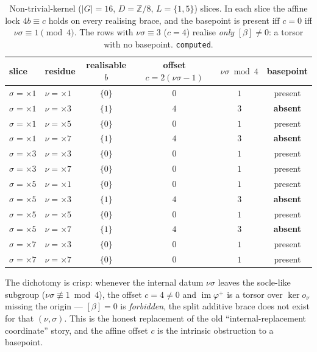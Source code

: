 \documentclass[11pt]{article}
\newcommand{\im}{\operatorname{im}}
\newcommand{\Z}{\mathbb{Z}}
\begin{document}
\begin{table}[h]
\centering
\small
\begin{tabular}{llcccc}
\toprule
slice & residue & realisable $b$ & offset $c=2(\nu\sigma{-}1)$ & $\nu\sigma\bmod 4$ & basepoint\\
\midrule
$\sigma={\times}1$ & $\nu={\times}1$ & $\{0\}$ & $0$ & $1$ & present\\
$\sigma={\times}1$ & $\nu={\times}3$ & $\{1\}$ & $4$ & $3$ & \textbf{absent}\\
$\sigma={\times}1$ & $\nu={\times}5$ & $\{0\}$ & $0$ & $1$ & present\\
$\sigma={\times}1$ & $\nu={\times}7$ & $\{1\}$ & $4$ & $3$ & \textbf{absent}\\
$\sigma={\times}3$ & $\nu={\times}3$ & $\{0\}$ & $0$ & $1$ & present\\
$\sigma={\times}3$ & $\nu={\times}7$ & $\{0\}$ & $0$ & $1$ & present\\
$\sigma={\times}5$ & $\nu={\times}1$ & $\{0\}$ & $0$ & $1$ & present\\
$\sigma={\times}5$ & $\nu={\times}3$ & $\{1\}$ & $4$ & $3$ & \textbf{absent}\\
$\sigma={\times}5$ & $\nu={\times}5$ & $\{0\}$ & $0$ & $1$ & present\\
$\sigma={\times}5$ & $\nu={\times}7$ & $\{1\}$ & $4$ & $3$ & \textbf{absent}\\
$\sigma={\times}7$ & $\nu={\times}3$ & $\{0\}$ & $0$ & $1$ & present\\
$\sigma={\times}7$ & $\nu={\times}7$ & $\{0\}$ & $0$ & $1$ & present\\
\bottomrule
\end{tabular}
\caption{Non-trivial-kernel ($|G|=16$, $D=\Z/8$, $L=\{1,5\}$) slices. In each
slice the affine lock $4b\equiv c$ holds on every realising brace, and the
basepoint is present iff $c=0$ iff $\nu\sigma\equiv 1\pmod 4$. The rows with
$\nu\sigma\equiv 3$ ($c=4$) realise \emph{only} $[\beta]\neq 0$: a torsor with no
basepoint. \texttt{computed}.}
\end{table}

\noindent The dichotomy is crisp: whenever the internal datum $\nu\sigma$ leaves
the socle-like subgroup ($\nu\sigma\not\equiv 1\bmod 4$), the offset $c=4\neq 0$
and $\im\varphi^+$ is a torsor over $\ker o_\nu$ missing the origin --- $[\beta]=0$
is \emph{forbidden}, the split additive brace does not exist for that $(\nu,\sigma)$.
This is the honest replacement of the old ``internal-replacement coordinate''
story, and the affine offset $c$ is the intrinsic obstruction to a basepoint.
\end{document}

